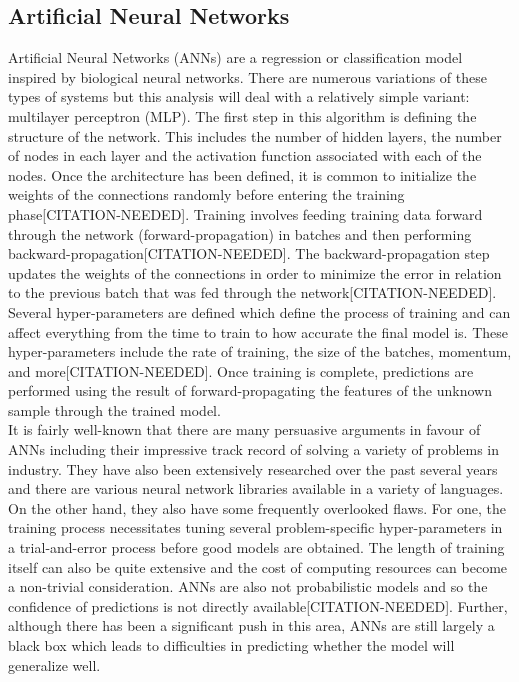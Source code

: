 \documentclass[titlepage]{article}
\begin{document}
\subsection{Artificial Neural Networks}
Artificial Neural Networks (ANNs) are a regression or classification model inspired by biological neural networks. There are numerous variations of these types of systems but this analysis will deal with a relatively simple variant: multilayer perceptron (MLP). The first step in this algorithm is defining the structure of the network. This includes the number of hidden layers, the number of nodes in each layer and the activation function associated with each of the nodes. Once the architecture has been defined, it is common to initialize the weights of the connections randomly before entering the training phase[CITATION-NEEDED]. Training involves feeding training data forward through the network (forward-propagation) in batches and then performing backward-propagation[CITATION-NEEDED]. The backward-propagation step updates the weights of the connections in order to minimize the error in relation to the previous batch that was fed through the network[CITATION-NEEDED]. Several hyper-parameters are defined which define the process of training and can affect everything from the time to train to how accurate the final model is. These hyper-parameters include the rate of training, the size of the batches, momentum, and more[CITATION-NEEDED]. Once training is complete, predictions are performed using the result of forward-propagating the features of the unknown sample through the trained model.\\
It is fairly well-known that there are many persuasive arguments in favour of ANNs including their impressive track record of solving a variety of problems in industry. They have also been extensively researched over the past several years and there are various neural network libraries available in a variety of languages. On the other hand, they also have some frequently overlooked flaws. For one, the training process necessitates tuning several problem-specific hyper-parameters in a trial-and-error process before good models are obtained. The length of training itself can also be quite extensive and the cost of computing resources can become a non-trivial consideration. ANNs are also not probabilistic models and so the confidence of predictions is not directly available[CITATION-NEEDED]. Further, although there has been a significant push in this area, ANNs are still largely a black box which leads to difficulties in predicting whether the model will generalize well.\\
\end{document}
